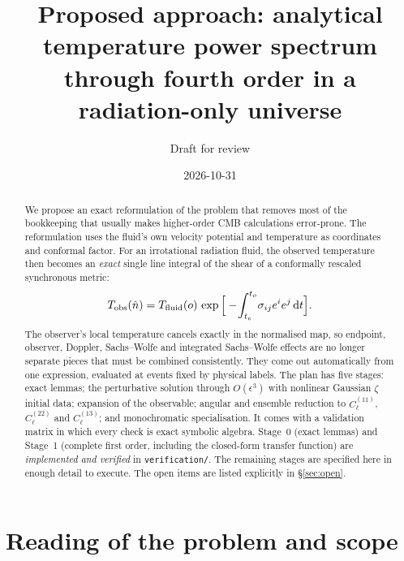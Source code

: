 \documentclass[11pt]{article}
\title{Proposed approach: analytical temperature power spectrum\\
through fourth order in a radiation-only universe}
\author{Draft for review}
\date{2026-10-31}
\theoremstyle{definition}
\theoremstyle{remark}
\newcommand{\eps}{\epsilon}
\newcommand{\nhat}{\hat n}
\newcommand{\dd}{\mathrm{d}}
\begin{document}
\maketitle

\begin{abstract}
We propose an exact reformulation of the problem that removes most of the
bookkeeping that usually makes higher-order CMB calculations error-prone.
The reformulation uses the fluid's own velocity potential and temperature as
coordinates and conformal factor. For an irrotational radiation fluid, the
observed temperature then becomes an \emph{exact} single line integral of
the shear of a conformally rescaled synchronous metric:
\[
T_{\rm obs}(\nhat)=T_{\rm fluid}(o)\,
\exp\Big[-\!\int_{t_e}^{t_o}\!\sigma_{ij}e^ie^j\,\dd t\Big].
\]
The observer's local temperature cancels exactly in the normalised map, so
endpoint, observer, Doppler, Sachs--Wolfe and integrated Sachs--Wolfe effects
are no longer separate pieces that must be combined consistently. They come
out automatically from one expression, evaluated at events fixed by physical
labels. The plan has five stages: exact lemmas; the perturbative solution
through $O(\eps^3)$ with nonlinear Gaussian $\zeta$ initial data; expansion
of the observable; angular and ensemble reduction to $C_\ell^{(11)}$,
$C_\ell^{(22)}$ and $C_\ell^{(13)}$; and monochromatic specialisation. It
comes with a validation matrix in which every check is exact symbolic
algebra.
Stage~0 (exact lemmas) and Stage~1 (complete first order, including the
closed-form transfer function) are \emph{implemented and verified} in
\texttt{verification/}. The remaining stages are specified here in enough
detail to execute. The open items are listed explicitly in
\S\ref{sec:open}.
\end{abstract}

\tableofcontents

\section{Reading of the problem and scope}
\end{document}
